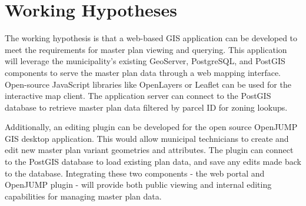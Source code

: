 
\chapter{Working Hypotheses}
\label{chp:working_hypotheses}

The working hypothesis is that a web-based GIS application can be developed to meet the requirements for master plan viewing and querying. This application will leverage the municipality's existing GeoServer, PostgreSQL, and PostGIS components to serve the master plan data through a web mapping interface. Open-source JavaScript libraries like OpenLayers or Leaflet can be used for the interactive map client. The application server can connect to the PostGIS database to retrieve master plan data filtered by parcel ID for zoning lookups.

Additionally, an editing plugin can be developed for the open source OpenJUMP GIS desktop application. This would allow municipal technicians to create and edit new master plan variant geometries and attributes. The plugin can connect to the PostGIS database to load existing plan data, and save any edits made back to the database. Integrating these two components - the web portal and OpenJUMP plugin - will provide both public viewing and internal editing capabilities for managing master plan data.


